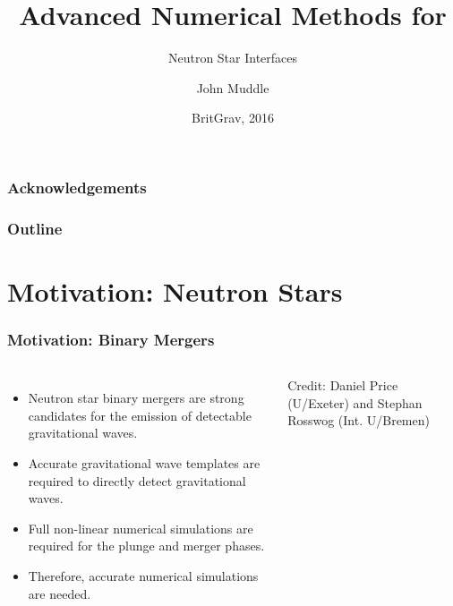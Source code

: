 \documentclass{beamer}
\title[Advanced Numerical Methods for Neutron Star Interfaces] %
{Advanced Numerical Methods for}
\subtitle{Neutron Star Interfaces}
\author[John Muddle - @john$\_$muddle] %
{John Muddle}
\institute[University of Southampton] %
{
  School of Mathematics\\
  University of Southampton\\[1\baselineskip]
  Supervisor - Ian Hawke

}
\date[Britgrav 2016] %
{BritGrav, 2016}
\begin{document}
\begin{frame}
  \titlepage
\end{frame}
\begin{frame}
\frametitle{Acknowledgements}
\end{frame}
 \begin{frame}
   \frametitle{Outline}
   \tableofcontents
 \end{frame}
\section{Motivation: Neutron Stars}

\begin{frame}
\frametitle{Motivation: Binary Mergers}
\begin{columns}
\begin{itemize}
\item{Neutron star binary mergers are strong candidates for the emission of detectable gravitational waves.}
\item{Accurate gravitational wave templates are required to directly detect gravitational waves.}
\item{Full non-linear numerical simulations are required for the plunge and merger phases.}
\item{Therefore, accurate numerical simulations are needed.}
\end{itemize}
\tiny Credit: Daniel Price (U/Exeter) and Stephan Rosswog (Int. U/Bremen)
\end{columns}
\end{frame}

\end{document}
